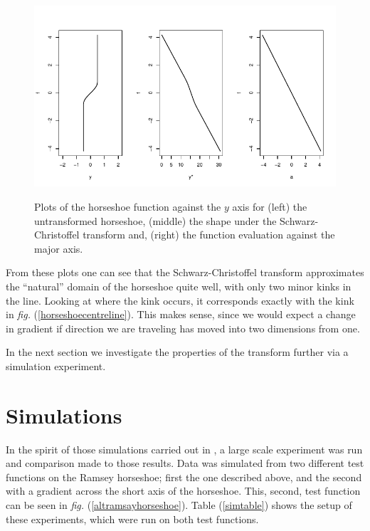 \documentclass[a4paper,10pt]{amsart}
\newcommand{\sch}{Schwarz-Christoffel }
\newcommand{\fig}[1]{\emph{fig.} (\ref{#1})}
\begin{document}
\begin{figure}
\centering
\includegraphics[trim=0in 0in 0in 0in]{figs/centrelinelineplots.pdf} \\
\caption{Plots of the horseshoe function against the $y$ axis for (left) the untransformed horseshoe, (middle) the shape under the \sch transform and, (right) the function evaluation against the major axis.}
\label{centrelinelineplot}
\end{figure}

From these plots one can see that the \sch transform approximates the ``natural'' domain of the horseshoe quite well, with only two minor kinks in the line. Looking at where the kink occurs, it corresponds exactly with the kink in \fig{horseshoecentreline}. This makes sense, since we would expect a change in gradient if direction we are traveling has moved into two dimensions from one.

In the next section we investigate the properties of the transform further via a simulation experiment.

\section{Simulations}

In the spirit of those simulations carried out in \cite{soap}, a large scale experiment was run and comparison made to those results. Data was simulated from two different test functions on the Ramsey horseshoe; first the one described above, and the second with a gradient across the short axis of the horseshoe. This, second, test function can be seen in \fig{altramsayhorseshoe}. Table (\ref{simtable}) shows the setup of these experiments, which were run on both test functions.
\end{document}
